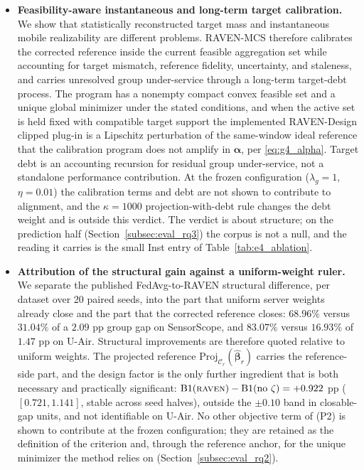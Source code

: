 \documentclass[letterpaper,journal]{IEEEtran}
\begin{document}
\begin{itemize}
    \item \textbf{Feasibility-aware instantaneous and long-term target
    calibration.}
    We show that statistically reconstructed target mass and instantaneous
    mobile realizability are different problems.  RAVEN-MCS therefore calibrates
    the corrected reference inside the current feasible aggregation set while
    accounting for target mismatch, reference fidelity, uncertainty, and
    staleness, and carries unresolved group under-service through a long-term
    target-debt process.  The program has a nonempty compact convex
    feasible set and a unique global minimizer under the stated conditions, and
    when the active set is held fixed with compatible target support the
    implemented RAVEN-Design clipped plug-in is a Lipschitz perturbation of the
    same-window ideal reference that the calibration program does not amplify in
    $\boldsymbol\alpha$, per \eqref{eq:g4_alpha}.
    Target debt is an accounting recursion for residual group under-service, not
    a standalone performance contribution.  At the frozen
    configuration ($\lambda_g=1$, $\eta=0.01$) the calibration terms and debt are
    not shown to contribute to alignment, and the $\kappa=1000$
    projection-with-debt rule changes the debt weight and is outside this
    verdict.  The verdict is about structure; on the prediction half
    (Section~\ref{subsec:eval_rq3}) the corpus is not a null, and the reading it
    carries is the small Inst entry of Table~\ref{tab:e4_ablation}.

    \item \textbf{Attribution of the structural gain against a uniform-weight
    ruler.}
    We separate the published FedAvg-to-RAVEN structural difference, per dataset
    over 20 paired seeds, into the part that uniform server weights already close
    and the part that the corrected reference closes: $68.96\%$ versus $31.04\%$
    of a $2.09$ pp group gap on SensorScope, and $83.07\%$ versus $16.93\%$ of
    $1.47$ pp on U-Air.  Structural improvements are therefore quoted relative to
    uniform weights.  The projected reference
    $\mathrm{Proj}_{\mathcal{C}_r}(\widehat{\boldsymbol\beta}_r)$ carries the
    reference-side part, and the design factor is the only further ingredient
    that is both necessary and practically significant:
    $\mathrm{B1}(\textsc{raven})-\mathrm{B1}(\text{no }\zeta)=+0.922$ pp
    ($[0.721,1.141]$, stable across seed halves), outside the $\pm0.10$ band in
    closable-gap units, and not identifiable on U-Air.  No other objective term
    of (P2) is shown to contribute at the frozen configuration; they are retained
    as the definition of the criterion and, through the reference anchor, for the
    unique minimizer the method relies on (Section~\ref{subsec:eval_rq2}).
\end{itemize}
\end{document}

